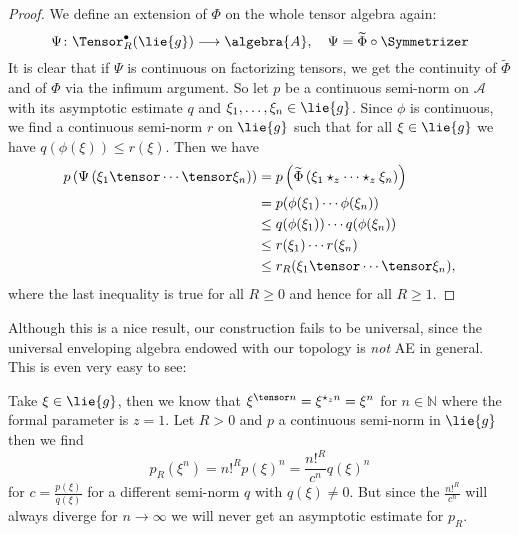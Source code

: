 \begin{proof}
    We define an extension of $\Phi$ on the whole tensor algebra
    again:
    \begin{equation*}
        \Psi \colon
        \Tensor_R^{\bullet}(\lie{g})
        \longrightarrow
        \algebra{A},
        \quad
        \Psi
        =
        \widetilde{\Phi} \circ \Symmetrizer
    \end{equation*}
    It is clear that if $\Psi$ is continuous on factorizing tensors,
    we get the continuity of $\widetilde{\Phi}$ and of $\Phi$ via the
    infimum argument. So let $p$ be a continuous semi-norm on
    $\mathcal{A}$ with its asymptotic estimate $q$ and $\xi_1, \ldots,
    \xi_n \in \lie{g}$. Since $\phi$ is continuous, we find a
    continuous semi-norm $r$ on $\lie{g}$ such that for all $\xi \in
    \lie{g}$ we have $q(\phi(\xi)) \leq r(\xi)$. Then we have
    \begin{align*}
        p \left(
        \Psi \left(
        \xi_1 \tensor \cdots \tensor \xi_n
        \right) \right)
        & =
        p \left(
        \widetilde{\Phi} \left(
        \xi_1 \star_z \cdots \star_z \xi_n
        \right) \right)
        \\
        & =
        p( \phi(\xi_1) \cdots \phi(\xi_n) )
        \\
        & \leq
        q( \phi(\xi_1) )
        \cdots
        q( \phi(\xi_n) )
        \\
        & \leq
        r(\xi_1) \cdots r(\xi_n)
        \\
        & \leq
        r_R(\xi_1 \tensor \cdots \tensor \xi_n),
    \end{align*}
    where the last inequality is true for all $R \geq 0$ and hence for all 
    $R \geq 1$.
\end{proof}
Although this is a nice result, our construction fails to be
universal, since the universal enveloping algebra endowed with our
topology is \emph{not} AE in general. This is even very easy to see:
\begin{example}
    Take $\xi \in \lie{g}$, then we know that $\xi^{\tensor n} =
    \xi^{\ostar_z n} = \xi^n$ for $n \in \mathbb{N}$ where the formal
    parameter is $z = 1$. Let $R > 0$ and $p$ a continuous semi-norm
    in $\lie{g}$ then we find
    \begin{equation}
        p_R(\xi^n)
        =
        n!^R p(\xi)^n
        =
        \frac{n!^R}{c^n} q(\xi)^n
    \end{equation}
    for $c = \frac{p(\xi)}{q(\xi)}$ for a different semi-norm $q$ with
    $q(\xi) \neq 0$.  But since the $\frac{n!^R}{c^n}$ will always
    diverge for $n \rightarrow \infty$ we will never get an asymptotic
    estimate for $p_R$.
\end{example}

